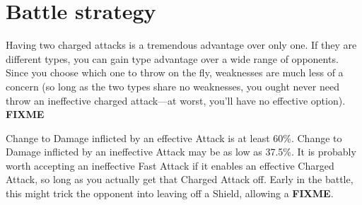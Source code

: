 \chapter{Battle strategy}
\label{chap:strategy}

Having two charged attacks is a tremendous advantage over only one.
If they are different types, you can gain type advantage over a wide
 range of opponents.
Since you choose which one to throw on the fly, weaknesses are
 much less of a concern (so long as the two types share no
 weaknesses, you ought never need throw an ineffective
 charged attack---at worst, you'll have no effective option).
\textbf{FIXME}

Change to Damage inflicted by an effective Attack is at least 60\%.
Change to Damage inflicted by an ineffective Attack may be as
 low as 37.5\%.
It is probably worth accepting an ineffective Fast Attack if it
 enables an effective Charged Attack, so long as you actually
 get that Charged Attack off.
Early in the battle, this might trick the opponent into leaving
 off a Shield, allowing a \textbf{FIXME}.


